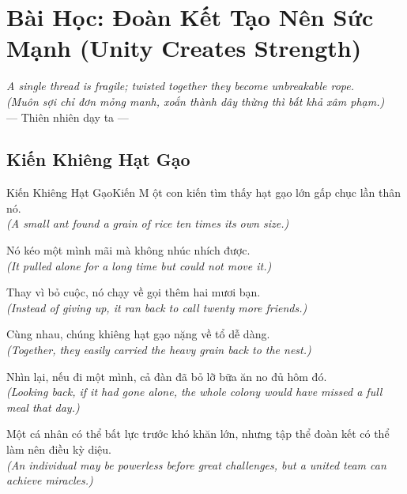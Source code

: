\chapter{Bài Học: Đoàn Kết Tạo Nên Sức Mạnh (Unity Creates Strength)}
\begin{center}
  \textit{\color{truyenblue}A single thread is fragile; twisted together they become unbreakable rope.}\\
  \textit{(Muôn sợi chỉ đơn mỏng manh, xoắn thành dây thừng thì bất khả xâm phạm.)}\\[4pt]
  \small\color{truyengold}--- Thiên nhiên dạy ta ---
\end{center}
\ngancach

\section{Kiến Khiêng Hạt Gạo}
\begin{truyen}{Kiến Khiêng Hạt Gạo}{Kiến}
M ột con kiến tìm thấy hạt gạo lớn gấp chục lần thân nó.\\
\textit{(A small ant found a grain of rice ten times its own size.)}

Nó kéo một mình mãi mà không nhúc nhích được.\\
\textit{(It pulled alone for a long time but could not move it.)}

Thay vì bỏ cuộc, nó chạy về gọi thêm hai mươi bạn.\\
\textit{(Instead of giving up, it ran back to call twenty more friends.)}

Cùng nhau, chúng khiêng hạt gạo nặng về tổ dễ dàng.\\
\textit{(Together, they easily carried the heavy grain back to the nest.)}

Nhìn lại, nếu đi một mình, cả đàn đã bỏ lỡ bữa ăn no đủ hôm đó.\\
\textit{(Looking back, if it had gone alone, the whole colony would have missed a full meal that day.)}

\end{truyen}
\begin{baihoc}
  Một cá nhân có thể bất lực trước khó khăn lớn, nhưng tập thể đoàn kết có thể làm nên điều kỳ diệu.\\
  \textit{(An individual may be powerless before great challenges, but a united team can achieve miracles.)}
\end{baihoc}

